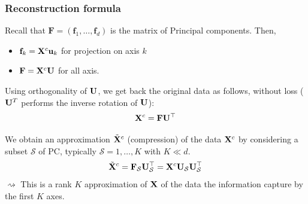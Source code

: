 \documentclass{beamer}\usepackage[]{graphicx}\usepackage[]{color}
\begin{document}
\begin{frame}
  \frametitle{Reconstruction formula}

    Recall that $\mathbf{F} = (\mathbf{f}_1, \dots, \mathbf{f}_d) $ is the matrix of Principal components. Then,  
    \begin{itemize}
      \item  $\mathbf{f}_k = \mathbf{X}^c \mathbf{u}_k$ for projection on axis $k$
      \item $\mathbf{F} = \mathbf{X}^c \mathbf{U}$ for all axis.
    \end{itemize}
    Using orthogonality of $\mathbf{U}$, we get back the original data as follows, without loss ($\mathbf{U}^T$ performs the inverse rotation of $\mathbf{U}$):
    \begin{equation*}
      \mathbf{X}^c = \mathbf{F}\mathbf{U}^\top 
    \end{equation*}

    \vfill
    \pause 
    
    We obtain an approximation $\tilde{\mathbf{X}}^c$ (compression) of the data $\mathbf{X}^c$ by considering a subset $\mathcal{S}$ of PC, typically $\mathcal{S} = {1, \dots,K}$ with $K \ll d$.
    \begin{equation*}
      \tilde{\mathbf{X}}^c = \mathbf{F}_{\mathcal{S}}\mathbf{U}_{\mathcal{S}}^\top = \mathbf{X}^c \mathbf{U}_{\mathcal{S}} \mathbf{U}_{\mathcal{S}}^\top
    \end{equation*}
    $\rightsquigarrow$ This is a rank $K$ approximation of $\mathbf{X}$ of the data the information capture by the first $K$ axes.

\end{frame}
\end{document}
